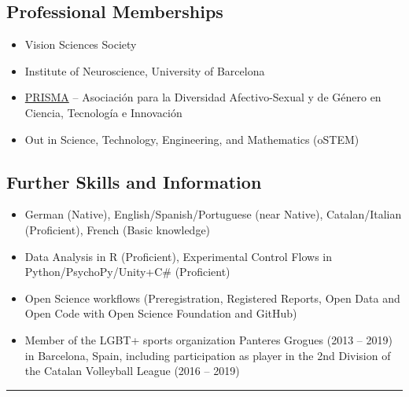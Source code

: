 \documentclass[]{article}
\begin{document}
\hypertarget{professional-memberships}{%
\subsection{Professional Memberships}\label{professional-memberships}}

\begin{itemize}
\item
  Vision Sciences Society
\item
  Institute of Neuroscience, University of Barcelona
\item
  \href{./PRISMA.html}{PRISMA} -- Asociación para la Diversidad
  Afectivo-Sexual y de Género en Ciencia, Tecnología e Innovación
\item
  Out in Science, Technology, Engineering, and Mathematics (oSTEM)
\end{itemize}

\hypertarget{further-skills-and-information}{%
\subsection{Further Skills and
Information}\label{further-skills-and-information}}

\begin{itemize}
\item
  German (Native), English/Spanish/Portuguese (near Native),
  Catalan/Italian (Proficient), French (Basic knowledge)
\item
  Data Analysis in R (Proficient), Experimental Control Flows in
  Python/PsychoPy/Unity+C\# (Proficient)
\item
  Open Science workflows (Preregistration, Registered Reports, Open Data
  and Open Code with Open Science Foundation and GitHub)
\item
  Member of the LGBT+ sports organization Panteres Grogues (2013 --
  2019) in Barcelona, Spain, including participation as player in the
  2nd Division of the Catalan Volleyball League (2016 -- 2019)
\end{itemize}

\begin{center}\rule{0.5\linewidth}{\linethickness}\end{center}
\end{document}
